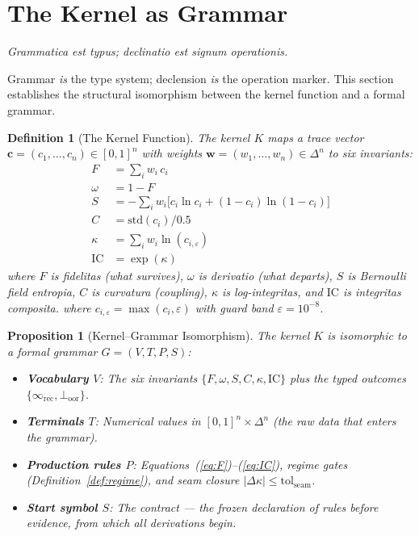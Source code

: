 \documentclass[
  aps,
  prd,
  twocolumn,
  superscriptaddress,
  nofootinbib,
  floatfix
]{revtex4-2}
\newtheorem{definition}[theorem]{Definition}
\newtheorem{proposition}[theorem]{Proposition}
\newcommand{\eps}{\varepsilon}
\newcommand{\IR}{\infty_{\mathrm{rec}}}
\newcommand{\tolseam}{\mathrm{tol}_{\mathrm{seam}}}
\newcommand{\tvec}{\mathbf{c}}
\newcommand{\wvec}{\mathbf{w}}
\newcommand{\Fid}{F}
\newcommand{\Drft}{\omega}
\newcommand{\Ent}{S}
\newcommand{\Curv}{C}
\newcommand{\Logint}{\kappa}
\newcommand{\IC}{\mathrm{IC}}
\newcommand{\lat}[1]{\textit{#1}}
\begin{document}
\section{The Kernel as Grammar}\label{sec:kernel-as-grammar}

\lat{Grammatica est typus; declinatio est signum operationis.}

\smallskip\noindent
Grammar \emph{is} the type system; declension \emph{is} the
operation marker. This section establishes the structural
isomorphism between the kernel function and a formal grammar.

\begin{definition}[The Kernel Function]\label{def:kernel}
The kernel $K$ maps a trace vector $\tvec = (c_1, \ldots, c_n)
\in [0,1]^n$ with weights $\wvec = (w_1,\ldots,w_n) \in
\Delta^n$ to six invariants:
\begin{align}
  \Fid &= \textstyle\sum_i w_i\, c_i \label{eq:F}\\
  \Drft &= 1 - \Fid \label{eq:omega}\\
  \Ent &= -\textstyle\sum_i w_i\bigl[c_i\ln c_i
    + (1{-}c_i)\ln(1{-}c_i)\bigr] \label{eq:S}\\
  \Curv &= \mathrm{std}(c_i)/0.5 \label{eq:C}\\
  \Logint &= \textstyle\sum_i w_i\ln(c_{i,\eps}) \label{eq:kappa}\\
  \IC &= \exp(\Logint) \label{eq:IC}
\end{align}
where $\Fid$ is \lat{fidelitas} (what survives), $\Drft$ is
\lat{derivatio} (what departs), $\Ent$ is Bernoulli field
\lat{entropia}, $\Curv$ is \lat{curvatura} (coupling),
$\Logint$ is \lat{log-integritas}, and $\IC$ is
\lat{integritas composita}.
where $c_{i,\eps} = \max(c_i, \eps)$ with guard band
$\eps = 10^{-8}$.
\end{definition}

\begin{proposition}[Kernel--Grammar Isomorphism]\label{prop:iso}
The kernel $K$ is isomorphic to a formal grammar $G = (V, T, P, S)$:
\begin{itemize}[nosep,leftmargin=*]
\item \textbf{Vocabulary $V$}: The six invariants
  $\{\Fid,\Drft,\Ent,\Curv,\Logint,\IC\}$ plus the typed outcomes
  $\{\IR, \bot_{\mathrm{oor}}\}$.
\item \textbf{Terminals $T$}: Numerical values in
  $[0,1]^n \times \Delta^n$ (the raw data that enters the grammar).
\item \textbf{Production rules $P$}: Equations~(\ref{eq:F})--(\ref{eq:IC}),
  regime gates (Definition~\ref{def:regime}), and seam closure
  $|\Delta\Logint| \leq \tolseam$.
\item \textbf{Start symbol $S$}: The contract --- the frozen declaration
  of rules before evidence, from which all derivations begin.
\end{itemize}
\end{proposition}
\end{document}
